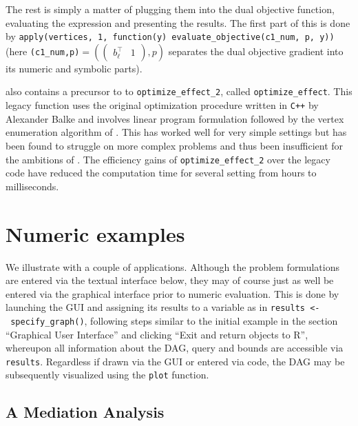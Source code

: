 The rest is simply a matter of plugging them into the dual objective function, evaluating the expression and presenting the results. The first part of this is done by \texttt{apply(vertices,\ 1,\ function(y)\ evaluate\_objective(c1\_num,\ p,\ y))} (here \texttt{(c1\_num,p)}\(=(\begin{pmatrix}b_{\ell}^\top&1\end{pmatrix},p)\) separates the dual objective gradient into its numeric and symbolic parts).

 also contains a precursor to to \texttt{optimize\_effect\_2}, called \texttt{optimize\_effect}. This legacy function uses the original optimization procedure written in \texttt{C++} by Alexander Balke and involves linear program formulation followed by the vertex enumeration algorithm of \citet{mattheiss1973algorithm}. This has worked well for very simple settings but has been found to struggle on more complex problems and thus been insufficient for the ambitions of . The efficiency gains of \texttt{optimize\_effect\_2} over the legacy code have reduced the computation time for several setting from hours to milliseconds.

\hypertarget{numeric-examples}{%
\section{Numeric examples}\label{numeric-examples}}

We illustrate with a couple of applications. Although the problem formulations are entered via the textual interface below, they may of course just as well be entered via the graphical interface prior to numeric evaluation. This is done by launching the GUI and assigning its results to a variable as in \texttt{results\ \textless{}-\ specify\_graph()}, following steps similar to the initial example in the section ``Graphical User Interface'' and clicking ``Exit and return objects to R'', whereupon all information about the DAG, query and bounds are accessible via \texttt{results}. Regardless if drawn via the GUI or entered via code, the DAG may be subsequently visualized using the \texttt{plot} function.

\hypertarget{a-mediation-analysis}{%
\subsection{A Mediation Analysis}\label{a-mediation-analysis}}


